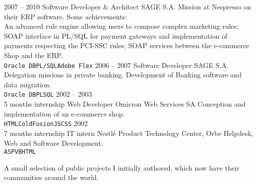 \documentclass[9pt]{developercv} %
\begin{document}
\begin{entrylist}
	\entry
		{2007 -- 2010}
		{Software Developer \& Architect}
		{SAGE S.A.}
		{Mission at Nespresso on their ERP software. Some achievements:\\
      An advanced rule engine allowing users to compose complex
      marketing rules; SOAP interface in PL/SQL for payment gateways and
      implementation of payments respecting the PCI-SSC rules; SOAP services
      between the e-commerce Shop and the ERP. \\
      \texttt{Oracle DB}\slashsep\texttt{PL/SQL}\slashsep\texttt{Adobe Flex}}
	\entry
		{2006 -- 2007}
		{Software Developer}
		{SAGE S.A.}
		{Delegation missions in private banking. Development of Banking software and
      data migration.\\
      \texttt{Oracle DB}\slashsep\texttt{PLSQL}}
	\entry
		{2002 -- 2003\\\footnotesize{5 months internship}}
		{Web Developer}
		{Omicron Web Services SA}
		{Conception and implementation of an e-commerce shop. \\
      \texttt{HTML}\slashsep\texttt{ColdFusion}\slashsep\texttt{JS}\slashsep\texttt{CSS}}
	\entry
		{2002\\\footnotesize{7 months internship}}
		{IT intern}
		{Nestlé Product Technology Center, Orbe}
		{Helpdesk, Web and Software Development. \\
      \texttt{ASP}\slashsep\texttt{VB}\slashsep\texttt{HTML}}
\end{entrylist}



{A small selection of public projects I initially authored, which now have their
  communities around the world.}\\
\end{document}
